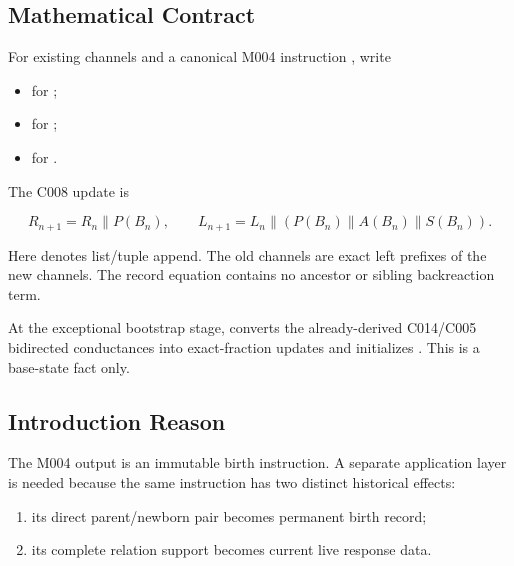 \subsection{Mathematical Contract}\label{mathematical-contract-10}

For existing channels \texttt{\protect{}} and a canonical M004
instruction \texttt{\protect{}}, write

\begin{itemize}
\tightlist
\item
  \texttt{\protect{}} for \texttt{\protect{}};
\item
  \texttt{\protect{}} for \texttt{\protect{}};
\item
  \texttt{\protect{}} for \texttt{\protect{}}.
\end{itemize}

The C008 update is

\[
R_{n+1}=R_n\mathbin{\|}P(B_n),
\qquad
L_{n+1}=L_n\mathbin{\|}(P(B_n)\mathbin{\|}A(B_n)\mathbin{\|}S(B_n)).
\]

Here \texttt{\protect\seqsplit{\textbar{}\textbar{}}} denotes list/tuple append. The old
channels are exact left prefixes of the new channels. The record
equation contains no ancestor or sibling backreaction term.

At the exceptional bootstrap stage, \texttt{\protect{}}
converts the already-derived C014/C005 bidirected conductances into
exact-fraction updates and initializes \texttt{\protect{}}. This is
a base-state fact only.

\subsection{Introduction Reason}\label{introduction-reason-26}

The M004 output is an immutable birth instruction. A separate
application layer is needed because the same instruction has two
distinct historical effects:

\begin{enumerate}
\def\labelenumi{\arabic{enumi}.}
\tightlist
\item
  its direct parent/newborn pair becomes permanent birth record;
\item
  its complete relation support becomes current live response data.
\end{enumerate}

